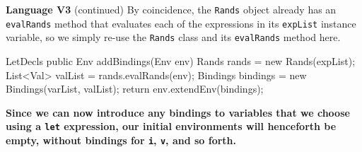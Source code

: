 \begin{minipage}[t]{\sw}
\slidenumber
\LARGE
{\bf Language V3} (continued)\exx
By coincidence, the \verb'Rands' object
already has an \verb'evalRands' method
that evaluates each of the expressions
in its \verb'expList' instance variable,
so we simply re-use the \verb'Rands' class
and its \verb'evalRands' method here.
\Large
\begin{qv}
LetDecls
    public Env addBindings(Env env) {
        Rands rands = new Rands(expList);
        List<Val> valList = rands.evalRands(env);
        Bindings bindings = new Bindings(varList, valList);
        return env.extendEnv(bindings);
    }
\end{qv}
\LARGE
{\bf Since we can now introduce any bindings to variables that we choose
using a \verb'let' expression,
our initial environments will henceforth be empty,
without bindings for \verb'i', \verb'v', and so forth.}
\end{minipage}
